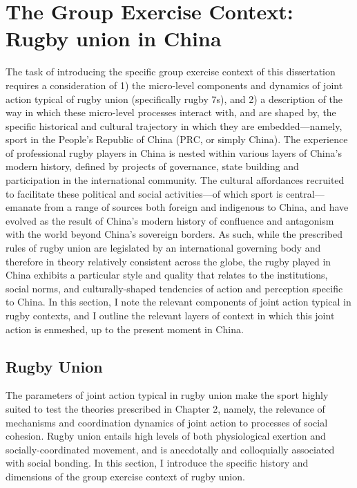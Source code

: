 \section{The Group Exercise Context: Rugby union in China}
The task of introducing the specific group exercise context of this dissertation requires a consideration of 1) the micro-level components and dynamics of joint action typical of rugby union (specifically rugby 7s), and 2) a description of the way in which these micro-level processes interact with, and are shaped by, the specific historical and cultural trajectory in which they are embedded---namely, sport in the People's Republic of China (PRC, or simply China).  The experience of professional rugby players in China is nested within various layers of China's modern history, defined by projects of governance, state building and participation in the international community.  The cultural affordances recruited to facilitate these political and social activities---of which sport is central---emanate from a range of sources both foreign and indigenous to China, and have evolved as the result of China's modern history of confluence and antagonism with the world beyond China's sovereign borders.  As such, while the prescribed rules of rugby union are legislated by an international governing body and therefore in theory relatively consistent across the globe, the rugby played in China exhibits a particular style and quality that relates to the institutions, social norms, and culturally-shaped tendencies of action and perception specific to China. In this section, I note the relevant components of joint action typical in rugby contexts, and I outline the relevant layers of context in which this joint action is enmeshed, up to the present moment in China.

  \subsection{Rugby Union}

The parameters of joint action typical in rugby union make the sport highly suited to test the theories prescribed in Chapter 2, namely, the relevance of mechanisms and coordination dynamics of joint action to processes of social cohesion.  Rugby union entails high levels of both physiological exertion and socially-coordinated movement, and is anecdotally and colloquially associated with social bonding.  In this section, I introduce the specific history and dimensions of the group exercise context of rugby union.

